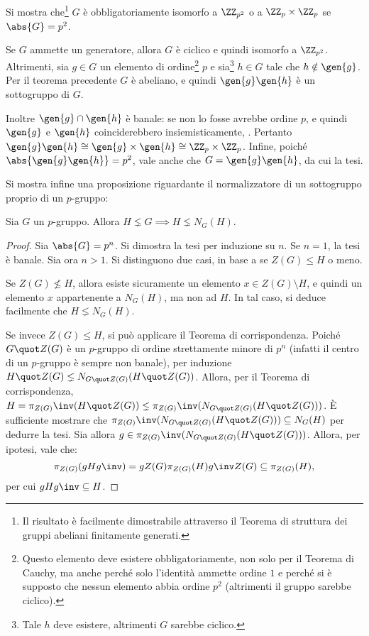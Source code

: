 \documentclass[12pt]{scrartcl}
\begin{document}
	
	\begin{example}
		Si mostra che\footnote{
			Il risultato è facilmente dimostrabile attraverso
			il Teorema di struttura dei gruppi abeliani
			finitamente generati.
		} $G$ è obbligatoriamente isomorfo a
		$\ZZ_{p^2}$ o a $\ZZ_p \times \ZZ_p$ se
		$\abs{G} = p^2$. \vskip 0.1in
		

		Se $G$ ammette un generatore,
		allora $G$ è ciclico e quindi isomorfo a $\ZZ_{p^2}$.
		Altrimenti, sia $g \in G$ un elemento di ordine\footnote{
			Questo elemento deve esistere obbligatoriamente, non
			solo per il Teorema di Cauchy, ma anche perché solo
			l'identità ammette ordine $1$ e perché si è supposto
			che nessun elemento abbia ordine $p^2$ (altrimenti
			il gruppo sarebbe ciclico).
		} $p$ e sia\footnote{
			Tale $h$ deve esistere, altrimenti $G$ sarebbe ciclico.
		} $h \in G$ tale che $h \notin \gen{g}$. Per il teorema
		precedente $G$ è abeliano, e quindi $\gen{g}\gen{h}$ è
		un sottogruppo di $G$. \medskip
		
		
		Inoltre $\gen{g} \cap \gen{h}$ è
		banale: se non lo fosse avrebbe ordine $p$, e quindi
		$\gen{g}$ e $\gen{h}$ coinciderebbero insiemisticamente,
		\Lightning. Pertanto $\gen{g}\gen{h} \cong \gen{g}
		\times \gen{h} \cong \ZZ_p \times \ZZ_p$. Infine, poiché
		$\abs{\gen{g} \gen{h}} = p^2$, vale anche che
		$G = \gen{g} \gen{h}$, da cui la tesi.
	\end{example}
	
	
	Si mostra infine una proposizione riguardante il normalizzatore
	di un sottogruppo proprio di un $p$-gruppo:
	
	\begin{proposition}
		Sia $G$ un $p$-gruppo. Allora $H \lneq G \implies
		H \lneq N_G(H)$.
	\end{proposition}
	
	\begin{proof}
		Sia $\abs{G} = p^n$. Si dimostra la tesi per induzione
		su $n$. Se $n = 1$, la tesi è banale. Sia ora $n > 1$.
		Si distinguono due casi, in base a se $Z(G) \leq H$ o
		meno. \medskip
		
		
		Se $Z(G) \nleq H$, allora esiste sicuramente un elemento
		$x \in Z(G) \setminus H$, e quindi un elemento $x$
		appartenente a $N_G(H)$, ma non ad $H$. In tal caso,
		si deduce facilmente che $H \lneq N_G(H)$. \medskip
		
		
		Se invece $Z(G) \leq H$, si può applicare il Teorema
		di corrispondenza. Poiché $G \quot Z(G)$ è un $p$-gruppo
		di ordine strettamente minore di $p^n$ (infatti il
		centro di un $p$-gruppo è sempre non banale), per
		induzione $H \quot Z(G) \lneq N_{G \quot Z(G)}(H \quot Z(G))$.
		Allora, per il Teorema di corrispondenza,
		$H = \pi_{Z(G)}\inv(H \quot Z(G)) \lneq \pi_{Z(G)}\inv(
		N_{G \quot Z(G)}(H \quot Z(G)))$. È sufficiente mostrare
		che $\pi_{Z(G)}\inv(
		N_{G \quot Z(G)}(H \quot Z(G))) \subseteq N_G(H)$ per
		dedurre la tesi. Sia allora $g \in \pi_{Z(G)}\inv(
		N_{G \quot Z(G)}(H \quot Z(G)))$. Allora, per ipotesi,
		vale che:
		\[ \pi_{Z(G)}(gHg\inv) = g Z(G) \pi_{Z(G)}(H) g\inv Z(G) \subseteq \pi_{Z(G)}(H), \]
		per cui $gHg\inv \subseteq H$.
	\end{proof}
\end{document}
